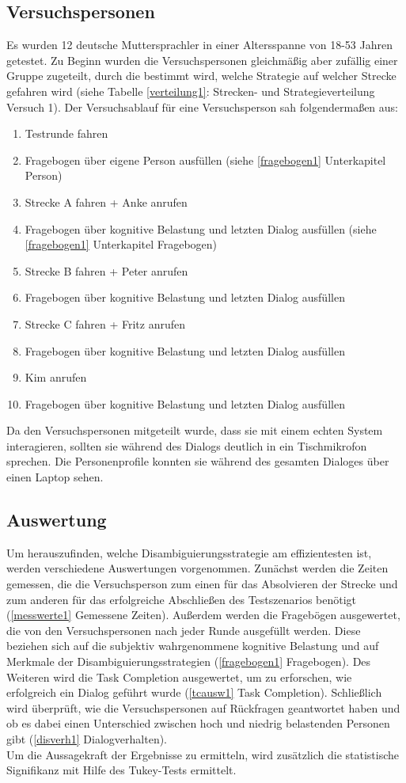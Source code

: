 \documentclass[12pt,a4paper]{scrartcl}
\begin{document}
\subsection{Versuchspersonen}
Es wurden 12 deutsche Muttersprachler in einer Altersspanne von 18-53 Jahren getestet. Zu Beginn wurden die Versuchspersonen gleichmäßig aber zufällig einer Gruppe zugeteilt, durch die bestimmt wird, welche Strategie auf welcher Strecke gefahren wird (siehe Tabelle \ref{verteilung1}: Strecken- und Strategieverteilung Versuch 1).
Der Versuchsablauf für eine Versuchsperson sah folgendermaßen aus:
\begin{enumerate}
\item Testrunde fahren
\item Fragebogen über eigene Person ausfüllen (siehe \ref{fragebogen1} Unterkapitel Person)
\item Strecke A fahren + Anke anrufen
\item Fragebogen über kognitive Belastung und letzten Dialog ausfüllen (siehe \ref{fragebogen1} Unterkapitel Fragebogen)
\item Strecke B fahren + Peter anrufen
\item Fragebogen über kognitive Belastung und letzten Dialog ausfüllen
\item Strecke C fahren + Fritz anrufen
\item Fragebogen über kognitive Belastung und letzten Dialog ausfüllen 
\item Kim anrufen
\item Fragebogen über kognitive Belastung und letzten Dialog ausfüllen 
\end{enumerate}

Da den Versuchspersonen mitgeteilt wurde, dass sie mit einem echten System interagieren, sollten sie während des Dialogs deutlich in ein Tischmikrofon sprechen. Die Personenprofile konnten sie während des gesamten Dialoges über einen Laptop sehen.

\subsection{Auswertung}
\label{auswertung1}
Um herauszufinden, welche Disambiguierungsstrategie am effizientesten ist, werden verschiedene Auswertungen vorgenommen. 
Zunächst werden die Zeiten gemessen, die die Versuchsperson zum einen für das Absolvieren der Strecke und zum anderen für das erfolgreiche Abschließen des Testszenarios benötigt (\ref{messwerte1} Gemessene Zeiten).
Außerdem werden die Fragebögen ausgewertet, die von den Versuchspersonen nach jeder Runde ausgefüllt werden. Diese beziehen sich auf die subjektiv wahrgenommene kognitive Belastung und auf Merkmale der Disambiguierungsstrategien (\ref{fragebogen1} Fragebogen). Des Weiteren wird die Task Completion ausgewertet, um zu erforschen, wie erfolgreich ein Dialog geführt wurde (\ref{tcausw1} Task Completion). Schließlich wird überprüft, wie die Versuchspersonen auf Rückfragen geantwortet haben und ob es dabei einen Unterschied zwischen hoch und niedrig belastenden Personen gibt (\ref{disverh1} Dialogverhalten). \\
Um die Aussagekraft der Ergebnisse zu ermitteln, wird zusätzlich die statistische Signifikanz mit Hilfe des Tukey-Tests ermittelt. 
\end{document}
